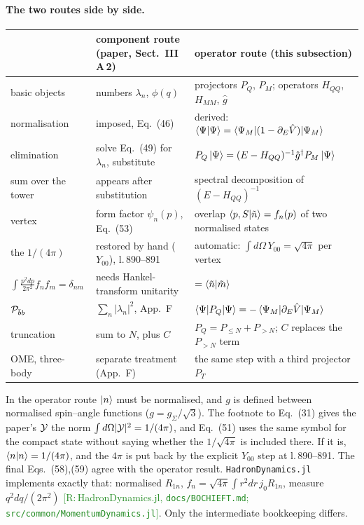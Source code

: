 \documentclass[11pt,a4paper]{article}
\newcommand{\tagR}[1]{\textcolor{ForestGreen}{\textsf{\small[R:\,#1]}}}
\newcommand{\calY}{{\cal Y}}
\begin{document}
\paragraph{The two routes side by side.}
\begin{center}
\small
\begin{tabular}{>{\raggedright\arraybackslash}p{2.9cm}>{\raggedright\arraybackslash}p{5.6cm}>{\raggedright\arraybackslash}p{6.6cm}}
\toprule
 & component route (paper, Sect.~III\,A\,2) & operator route (this subsection)\\
\midrule
basic objects & numbers $\lambda_n$, $\phi(q)$ & projectors $P_Q$, $P_M$; operators $H_{QQ}$, $H_{MM}$, $\hat g$\\
normalisation & imposed, Eq.~(46) & derived: $\braket{\Psi|\Psi}=\braket{\Psi_M|(1-\partial_E\hat V)|\Psi_M}$\\
elimination & solve Eq.~(49) for $\lambda_n$, substitute & $P_Q\ket\Psi=(E-H_{QQ})^{-1}\hat g^\dagger P_M\ket\Psi$\\
sum over the tower & appears after substitution & spectral decomposition of $(E-H_{QQ})^{-1}$\\
vertex & form factor $\psi_n(p)$, Eq.~(53) & overlap $\braket{p,S|\tilde n}=f_n(p)$ of two normalised states\\
the $1/(4\pi)$ & restored by hand ($Y_{00}$), l.\,890--891 & automatic: $\int d\Omega\,Y_{00}=\sqrt{4\pi}$ per vertex\\
$\int\frac{p^2dp}{2\pi^2}f_nf_m=\delta_{nm}$ & needs Hankel-transform unitarity & $=\braket{\tilde n|\tilde m}$\\
${\cal P}_{\bar bb}$ & $\sum_n|\lambda_n|^2$, App.~F & $\braket{\Psi|P_Q|\Psi}=-\braket{\Psi_M|\partial_E\hat V|\Psi_M}$\\
truncation & sum to $N$, plus $C$ & $P_Q=P_{\le N}+P_{>N}$; $C$ replaces the $P_{>N}$ term\\
OME, three-body & separate treatment (App.~F) & the same step with a third projector $P_T$\\
\bottomrule
\end{tabular}
\end{center}

\begin{warnbox}
In the operator route $\ket n$ must be normalised, and $g$ is defined between normalised spin--angle functions ($g=g_\Sigma/\sqrt3$). The footnote to Eq.~(31) gives the paper's $\calY$ the norm $\int d\Omega|\calY|^2=1/(4\pi)$, and Eq.~(51) uses the same symbol for the compact state without saying whether the $1/\sqrt{4\pi}$ is included there. If it is, $\braket{n|n}=1/(4\pi)$, and the $4\pi$ is put back by the explicit $Y_{00}$ step at l.\,890--891. The final Eqs.~(58),(59) agree with the operator result. \texttt{HadronDynamics.jl} implements exactly that: normalised $R_{1n}$, $f_n=\sqrt{4\pi}\int r^2dr\,j_0R_{1n}$, measure $q^2dq/(2\pi^2)$ \tagR{HadronDynamics.jl, \texttt{docs/BOCHIEFT.md}; \texttt{src/common/MomentumDynamics.jl}}. Only the intermediate bookkeeping differs.
\end{warnbox}
\end{document}
